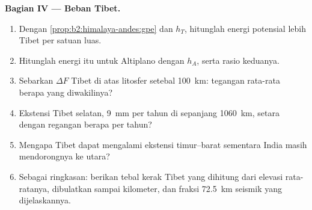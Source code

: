 \begin{problem}
\noindent\textbf{Bagian IV --- Beban Tibet.}
\begin{enumerate}[resume]
\item Dengan \cref{prop:b2:himalaya-andes:gpe} dan $h_T$, hitunglah energi potensial lebih Tibet
per satuan luas.
\item Hitunglah energi itu untuk Altiplano dengan $h_A$, serta rasio keduanya.
\item Sebarkan $\Delta F$ Tibet di atas litosfer setebal \qty{100}{km}: tegangan rata-rata berapa yang
diwakilinya?
\item Ekstensi Tibet selatan, \qty{9}{mm} per tahun di sepanjang \qty{1060}{km}, setara dengan regangan berapa
per tahun?
\item Mengapa Tibet dapat mengalami ekstensi timur--barat sementara India masih mendorongnya ke utara?
\item Sebagai ringkasan: berikan tebal kerak Tibet yang dihitung dari elevasi rata-ratanya, dibulatkan
sampai kilometer, dan fraksi \qty{72.5}{km} seismik yang dijelaskannya.
\end{enumerate}
\end{problem}
